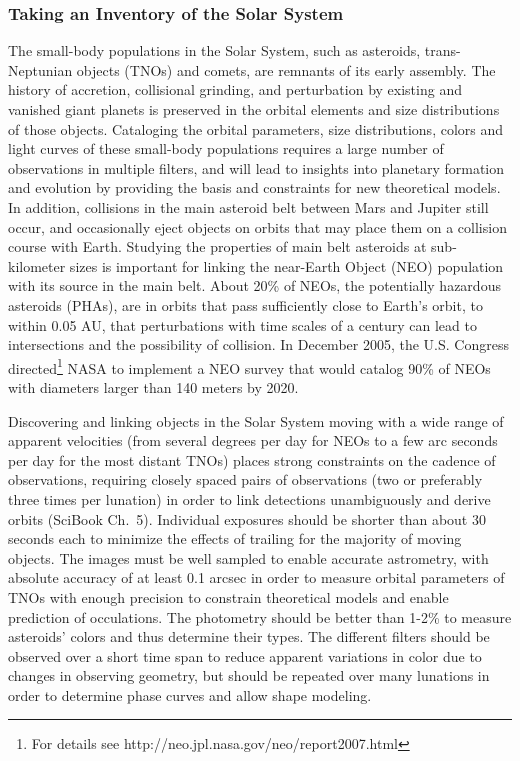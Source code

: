 \documentclass{emulateapj}
\begin{document}
\subsubsection{Taking an Inventory of the Solar System}


The small-body populations in the Solar System, such as asteroids, trans-Neptunian objects (TNOs) 
and comets, are remnants of its early assembly. The history of accretion, collisional grinding, and 
perturbation by existing and vanished giant planets is preserved in the orbital elements and size 
distributions of those objects. Cataloging the orbital parameters, size distributions, colors and light 
curves of these small-body populations requires a large number of observations in multiple filters, 
and will lead to insights into planetary formation and evolution by providing the basis and constraints 
for new theoretical models. In addition, collisions in the main asteroid belt between Mars and Jupiter 
still occur, and occasionally eject objects on orbits that may place them on a collision course with Earth. 
Studying the properties of main belt asteroids at sub-kilometer sizes is important for linking the near-Earth 
Object (NEO) population with its source in the main belt. About 20\% of NEOs, the potentially hazardous 
asteroids (PHAs), are in orbits that pass sufficiently close to Earth's orbit, to within 0.05 AU, that perturbations 
with time scales of a century can lead to intersections and the possibility of collision. In December 2005, 
the U.S. Congress directed\footnote{For details see http://neo.jpl.nasa.gov/neo/report2007.html} NASA to 
implement a NEO survey that would catalog 90\% of NEOs with diameters larger than 140 meters by 2020.  

Discovering and linking objects in the Solar System moving with a wide range of apparent velocities (from 
several degrees per day for NEOs to a few arc seconds per day for the most distant TNOs) places strong 
constraints on the cadence of observations, requiring closely spaced pairs of observations (two or preferably 
three times per lunation) in order to link detections unambiguously and derive orbits (SciBook Ch.~5). Individual 
exposures should be shorter than about 30 seconds each to minimize the effects of trailing for the majority of 
moving objects. The images must be well sampled to enable accurate astrometry, with absolute accuracy of at 
least 0.1 arcsec in order to measure orbital parameters of TNOs with enough precision to constrain theoretical 
models and enable prediction of occulations. The photometry should be
better than 1-2\% to measure asteroids' colors and thus determine
their types.  The different filters
should be observed over a short time span to reduce apparent 
variations in color due to changes in observing geometry, but should
be repeated over many lunations in order to determine phase curves and allow shape modeling. 
\end{document}
